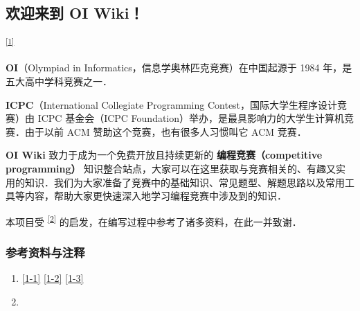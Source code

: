 \label{sect:OIwikidocsindex}

\subsection*{欢迎来到 {\bfseries OI Wiki}！  }
\par {}\textsuperscript{\label{endnoteref:OIwikidocsindexOutLink_1-3}\hyperref[endnote:OIwikidocsindexOutLink_1]{[1]}}
\par {\bfseries OI}（Olympiad in Informatics，信息学奥林匹克竞赛）在中国起源于 1984 年，是五大高中学科竞赛之一．
\par {\bfseries ICPC}（International Collegiate Programming Contest，国际大学生程序设计竞赛）由 ICPC 基金会（ICPC Foundation）举办，是最具影响力的大学生计算机竞赛．由于以前 ACM 赞助这个竞赛，也有很多人习惯叫它 ACM 竞赛．
\par {\bfseries OI Wiki} 致力于成为一个免费开放且持续更新的 {\bfseries 编程竞赛（competitive programming）} 知识整合站点，大家可以在这里获取与竞赛相关的、有趣又实用的知识．我们为大家准备了竞赛中的基础知识、常见题型、解题思路以及常用工具等内容，帮助大家更快速深入地学习编程竞赛中涉及到的知识．
\par 本项目受 \textsuperscript{\label{endnoteref:OIwikidocsindexOutLink_2-1}\hyperref[endnote:OIwikidocsindexOutLink_2]{[2]}} 的启发，在编写过程中参考了诸多资料，在此一并致谢．


\subsubsection{参考资料与注释}
\begin{enumerate}
\renewcommand{\labelenumi}{[\theenumi]}
\item\label{endnote:OIwikidocsindexOutLink_1} \hyperref[endnoteref:OIwikidocsindexOutLink_1-1]{[1-1]} \hyperref[endnoteref:OIwikidocsindexOutLink_1-2]{[1-2]} \hyperref[endnoteref:OIwikidocsindexOutLink_1-3]{[1-3]}\hfill \quad {}
\renewcommand{\labelenumi}{\hyperref[endnoteref:OIwikidocsindexOutLink_2-1]{[\theenumi]}}
\item\label{endnote:OIwikidocsindexOutLink_2}\hfill \quad {}
\end{enumerate}
